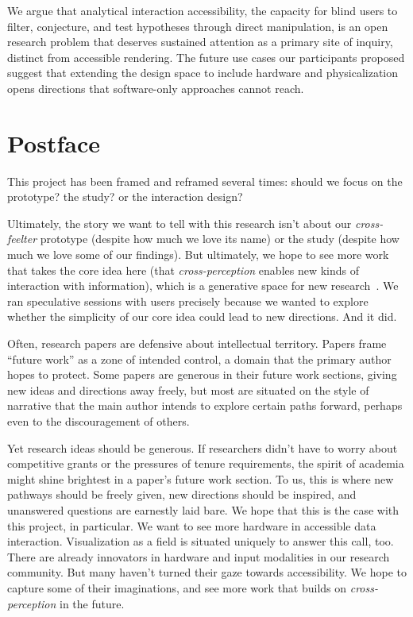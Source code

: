 \documentclass[12pt]{cmuthesis}
\begin{document}
We argue that analytical interaction accessibility, the capacity for blind users to filter, conjecture, and test hypotheses through direct manipulation, is an open research problem that deserves sustained attention as a primary site of inquiry, distinct from accessible rendering. The future use cases our participants proposed suggest that extending the design space to include hardware and physicalization opens directions that software-only approaches cannot reach.

\newpage

\section{Postface}

This project has been framed and reframed several times: should we focus on the prototype? the study? or the interaction design?

Ultimately, the story we want to tell with this research isn't about our \textit{cross-feelter} prototype (despite how much we love its name) or the study (despite how much we love some of our findings). But ultimately, we hope to see more work that takes the core idea here (that \textit{cross-perception} enables new kinds of interaction with information), which is a generative space for new research~\cite{BeaudouinLafon2021}. We ran speculative sessions with users precisely because we wanted to explore whether the simplicity of our core idea could lead to new directions. And it did.

Often, research papers are defensive about intellectual territory. Papers frame ``future work'' as a zone of intended control, a domain that the primary author hopes to protect. Some papers are generous in their future work sections, giving new ideas and directions away freely, but most are situated on the style of narrative that the main author intends to explore certain paths forward, perhaps even to the discouragement of others.

Yet research ideas should be generous. If researchers didn't have to worry about competitive grants or the pressures of tenure requirements, the spirit of academia might shine brightest in a paper's future work section. To us, this is where new pathways should be freely given, new directions should be inspired, and unanswered questions are earnestly laid bare. We hope that this is the case with this project, in particular. We want to see more hardware in accessible data interaction. Visualization as a field is situated uniquely to answer this call, too. There are already innovators in hardware and input modalities in our research community. But many haven't turned their gaze towards accessibility. We hope to capture some of their imaginations, and see more work that builds on \textit{cross-perception} in the future.
\end{document}
